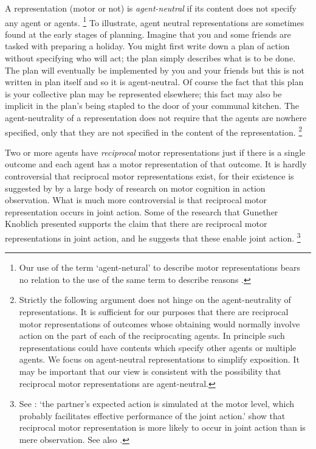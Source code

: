 \documentclass[12pt,\papersize]{extarticle}
\begin{document}
A representation (motor or not) is \emph{agent-neutral} if its content does not specify any agent or agents.%
\footnote{
Our use of the term `agent-netural' to describe motor representations bears no relation to the use of the same term  to describe reasons \citep[on the latter, see][]{Parfit:1984fk}.
}
To illustrate, agent neutral representations are sometimes found at the early stages of planning.
Imagine that you and some friends are tasked with preparing a holiday.  
You might first write down a plan of action without specifying who will act; the plan simply describes what is to be done.
The plan  will eventually be implemented by you and your friends
 but this is not written in plan itself  and so it is agent-neutral.
Of course the fact that this plan is your collective plan may be represented elsewhere; this fact may also be implicit in  the plan's being stapled to the door of your communal kitchen.
The agent-neutrality of a representation does not require that the agents are nowhere specified, only that they are not specified in the content of the representation.%
\footnote{
Strictly the following argument does not hinge on the agent-neutrality of representations.
It is sufficient for our purposes that there are reciprocal motor representations  of outcomes whose obtaining would normally involve action on the part of each of the reciprocating agents.
In principle such representations could have contents which specify other agents or multiple agents. 
We focus on agent-neutral representations to simplify exposition.
It may be important that our view is consistent with the possibility that reciprocal motor representations are agent-neutral. 
}

Two or more agents have \emph{reciprocal} motor representations  just if there is a single outcome and each agent has a motor representation of that outcome. 
It is hardly controversial that reciprocal motor representations exist, for their existence is suggested by by a large body of research on motor cognition in action observation.
What is much more controversial is that reciprocal motor representation occurs in joint action.
Some of the research that Gunether Knoblich presented supports the claim that there are reciprocal motor representations in joint action, and he suggests that these enable joint action.%
\footnote{
See \citet{kourtis:2012_predictive}: `the partner’s expected action is simulated at the motor level, which probably facilitates effective performance of the joint action.'
\citet{kourtis:2010_favoritism} show that 
reciprocal motor representation is more likely to occur in joint action than is mere observation. 
See also \citet{Knoblich:2003nf}.
 }
\end{document}
